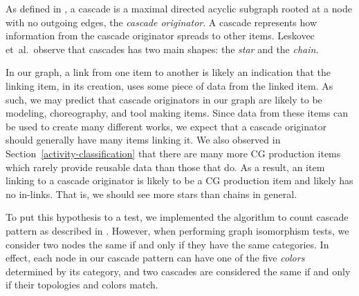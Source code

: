 \documentclass[10pt, a4paper]{article}
\newcommand{\etal}{{et~al.}}
\begin{document}
As defined in \cite{Gruhl:2004}, a cascade is a maximal directed acyclic subgraph rooted at a node with no outgoing edges, the \emph{cascade originator}. A cascade represents how information from the cascade originator spreads to other items. Leskovec \etal~observe that cascades has two main shapes: the \emph{star} and the \emph{chain}.

In our graph, a link from one item to another is likely an indication that the linking item, in its creation, uses some piece of data from the linked item. As such, we may predict that cascade originators in our graph are likely to be modeling, choreography, and tool making items. Since data from these items can be used to create many different works, we expect that a cascade originator should generally have many items linking it. We also observed in Section~\ref{activity-classification} that there are many more CG production items which rarely provide reusable data than those that do. As a result, an item linking to a cascade originator is likely to be a CG production item and likely has no in-links. That is, we should see more stars than chains in general.

To put this hypothesis to a test, we implemented the algorithm to count cascade pattern as described in \cite{Leskovec:2006}. However, when performing graph isomorphism tests, we consider two nodes the same if and only if they have the same categories. In effect, each node in our cascade pattern can have one of the five \emph{colors} determined by its category, and two cascades are considered the same if and only if their topologies and colors match.
\end{document}
